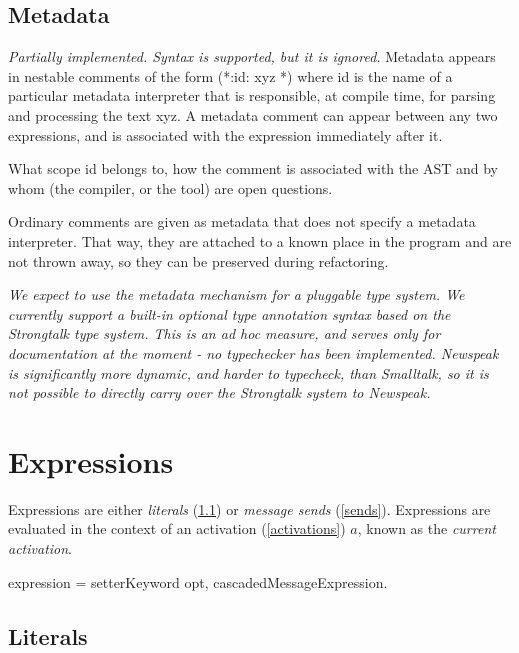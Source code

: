 \documentclass{article}
\newcommand{\code}[1]{{\sf #1}}
\begin{document}
\subsection{Metadata}
\label{metadata}

{\it Partially implemented. Syntax is supported, but it is ignored.} Metadata appears in nestable comments of the form \code{ (*:id: xyz *)} where \code{id} is the name of a particular metadata interpreter that is responsible, at compile time, for parsing and processing the text \code{xyz}. A metadata comment can appear between any two expressions, and is associated with the expression immediately after it.

What scope \code{id} belongs to, how the comment is associated with the AST and by whom (the compiler, or the tool) are open questions.

Ordinary comments are given as metadata that does not specify a metadata interpreter. That way, they are attached to a known place in the program and are not thrown away, so they can be preserved during refactoring.


{\it
We expect to use the metadata mechanism for a pluggable type system. We currently support a built-in optional type annotation syntax based on the Strongtalk type system. This is an ad hoc measure, and serves only for documentation at the moment - no typechecker has been implemented. Newspeak is significantly more dynamic, and harder to typecheck, than Smalltalk, so it is not possible to directly carry over the Strongtalk system to Newspeak. 
}

\section{Expressions}
\label{expression}

Expressions are either {\em literals} (\ref{literals}) or {\em message sends} (\ref{sends}). Expressions are evaluated in the context of an activation (\ref{activations}) $a$, known as the {\em current activation}.

\begin{newspeak}
expression = setterKeyword opt, cascadedMessageExpression.
\end{newspeak}

\subsection{Literals}
\label{literals}
\end{document}
